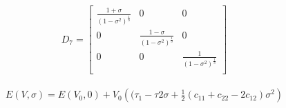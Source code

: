\begin{center}
\begin{minipage}{.39\textwidth}
  \begin{equation}
    \begin{split}
      D_{7} = 
      \begin{bmatrix}
      \frac{1 + \sigma}{(1-\sigma^2)^{\frac{1}{3}}} & 0           & 0              \\
      0                                    & \frac{1 - \sigma}{(1-\sigma^2)^{\frac{1}{3}}}      &   0  \\
      0  &   0  & \frac{1}{(1-\sigma^2)^{\frac{1}{3}}}       \\
      \end{bmatrix}
    \end{split}
  \label{eq:distortion7}
  \end{equation}
\end{minipage}
\begin{minipage}{.04\textwidth}
\end{minipage}
\begin{minipage}{.56\textwidth}
  \begin{equation}
    \begin{split}
    E(V,\sigma) = E(V_{0},0) + V_{0} \left((\tau_{1}-\tau{2} \sigma + \frac{1}{2} (c_{11} + c_{22} - 2 c_{12}) \sigma^2 \right)
    \end{split}
  \label{eq:distortion7energy}
  \end{equation}
\end{minipage}
\end{center}


